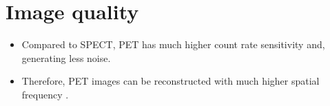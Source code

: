\section{Image quality}
\begin{itemize}
\item Compared to SPECT, PET has much higher count rate sensitivity
  and, generating less noise.
\item Therefore, PET images can be reconstructed with much higher
  spatial frequency \cite{abdulla2025NIQ}.
\end{itemize}
